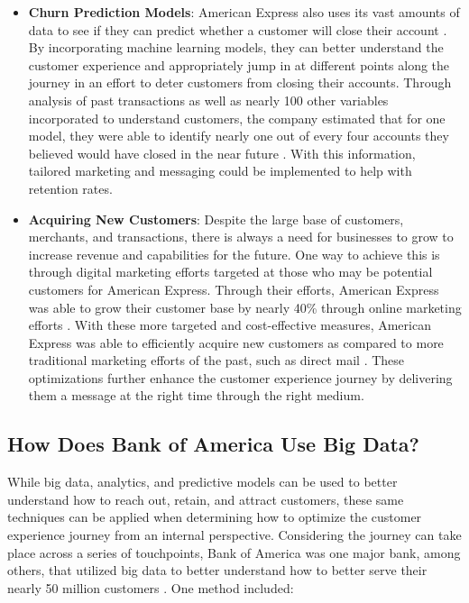\documentclass[sigconf]{acmart}
\begin{document}
\begin{itemize}
  \item \textbf{Churn Prediction Models}: American Express also uses its vast amounts of data to see if they can predict whether a customer will close their account \cite{Manglani2017}. By incorporating machine learning models, they can better understand the customer experience and appropriately jump in at different points along the journey in an effort to deter customers from closing their accounts. Through analysis of past transactions as well as nearly 100 other variables incorporated to understand customers, the company estimated that for one model, they were able to identify nearly one out of every four accounts they believed would have closed in the near future \cite{Manglani2017}. With this information, tailored marketing and messaging could be implemented to help with retention rates. 
 
 
  \item \textbf{Acquiring New Customers}: Despite the large base of customers, merchants, and transactions, there is always a need for businesses to grow to increase revenue and capabilities for the future. One way to achieve this is through digital marketing efforts targeted at those who may be potential customers for American Express. Through their efforts, American Express was able to grow their customer base by nearly 40\% through online marketing efforts \cite{Manglani2017}. With these more targeted and cost-effective measures, American Express was able to efficiently acquire new customers as compared to more traditional marketing efforts of the past, such as direct mail \cite{Manglani2017}. These optimizations further enhance the customer experience journey by delivering them a message at the right time through the right medium. 
 \end{itemize}
  
\subsection{How Does Bank of America Use Big Data?}
While big data, analytics, and predictive models can be used to better understand how to reach out, retain, and attract customers, these same techniques can be applied when determining how to optimize the customer experience journey from an internal perspective. Considering the journey can take place across a series of touchpoints, Bank of America was one major bank, among others, that utilized big data to better understand how to better serve their nearly 50 million customers \cite{Davenport2013}. One method included:
\end{document}
